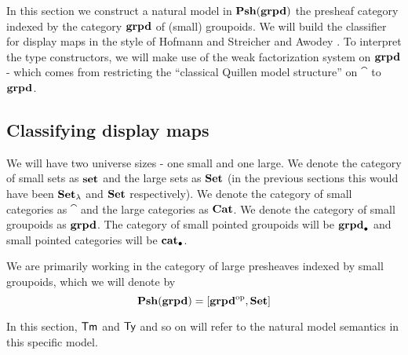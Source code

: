 In this section we construct a natural model in $\mathbf{Psh}(\mathbf{grpd})$ the presheaf category
indexed by the category $\mathbf{grpd}$ of (small) groupoids.
We will build the classifier for display maps in the style of
Hofmann and Streicher \cite{hofmannstreicher1996} and Awodey \cite{awodey2023hofmannstreicheruniverses}.
To interpret the type constructors,
we will make use of the weak factorization system on $\mathbf{grpd}$ -
which comes from restricting the ``classical Quillen model structure'' on
$\cat$ \cite{joyalnlabmodelstructuresoncat} to $\mathbf{grpd}$.

\medskip

\subsection{Classifying display maps}

\medskip

\begin{notation*}
  We will have two universe sizes - one small and one large.
  We denote the category of small sets as $\mathbf{set}$ and the large sets as $\mathbf{Set}$
  (in the previous sections this would have been $\mathbf{Set}_{\lambda}$ and $\mathbf{Set}$ respectively).
  We denote the category of small categories as $\cat$ and the large categories as $\mathbf{Cat}$.
  We denote the category of small groupoids as $\mathbf{grpd}$. %
  The category of small pointed groupoids will be $\mathbf{grpd}_\bullet$ and small pointed categories will be $\mathbf{cat}_\bullet$.

  We are primarily working in the category of large presheaves indexed by small groupoids,
  which we will denote by
  \[ \mathbf{Psh}(\mathbf{grpd}) = [\mathbf{grpd}^{\mathrm{op}}, \mathbf{Set}]\]

  In this section, $\mathsf{Tm}$ and $\mathsf{Ty}$ and so on will refer to the natural model semantics in this
  specific model.
\end{notation*}

\medskip

